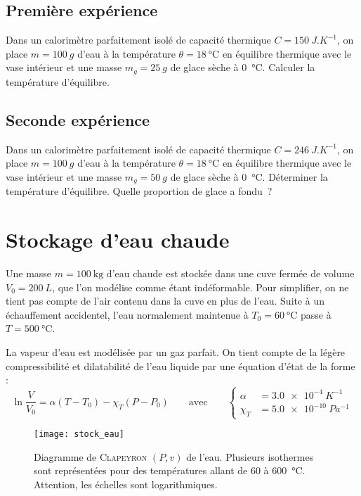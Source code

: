\documentclass[a4paper, 10pt, final, garamond]{book}
\begin{document}
\begin{multicols}{2}
  \subsection{Première expérience}
  Dans un calorimètre parfaitement isolé de capacité thermique $C =
  \SI{150}{J.K^{-1}}$, on place $m = \SI{100}{g}$ d'eau à la température $\theta
  = \SI{18}{\degreeCelsius}$ en équilibre thermique avec le vase intérieur et
  une masse $m_g = \SI{25}{g}$ de glace sèche à \SI{0}{\degreeCelsius}. Calculer
  la température d'équilibre.

  \subsection{Seconde expérience}
  Dans un calorimètre parfaitement isolé de capacité thermique $C =
  \SI{246}{J.K^{-1}}$, on place $m = \SI{100}{g}$ d'eau à la température $\theta
  = \SI{18}{\degreeCelsius}$ en équilibre thermique avec le vase intérieur et
  une masse $m_g = \SI{50}{g}$ de glace sèche à \SI{0}{\degreeCelsius}.
  Déterminer la température d'équilibre. Quelle proportion de glace a fondu~?
\end{multicols}

\section{Stockage d'eau chaude}
Une masse $m = \SI{100}{\kilo\gram}$ d’eau chaude est stockée dans une cuve
fermée de volume $V_0 = \SI{200}{L}$, que l’on modélise comme étant
indéformable. Pour simplifier, on ne tient pas compte de l’air contenu dans la
cuve en plus de l’eau. Suite à un échauffement accidentel, l’eau normalement
maintenue à $T_0 = \SI{60}{\degreeCelsius}$ passe à $T =
\SI{500}{\degreeCelsius}$.

La vapeur d’eau est modélisée par un gaz parfait. On tient compte de la légère compressibilité et dilatabilité de l’eau liquide par une équation d’état de la forme :
	\[
		\ln \frac{V}{V_0}=\alpha (T-T_0)-\chi_T(P-P_0)
		\qquad \text{avec} \qquad
		\left\{
		\begin{aligned}
			\alpha &= \SI{3.0e-4}{K^{-1}}\\
			\chi_T &= \SI{5.0e-10}{Pa^{-1}}
		\end{aligned}
		\right.
  \]
	
  \begin{figure}[h!]
    \centering
    \texttt{[image: stock\_eau]}
    \caption{Diagramme de \textsc{Clapeyron} $(P,v)$ de l'eau. Plusieurs
      isothermes sont représentées pour des températures allant de 60 à
      \SI{600}{\degreeCelsius}. Attention, les échelles sont logarithmiques.
    }
    \label{fig:stock_eau}
  \end{figure}
\end{document}
